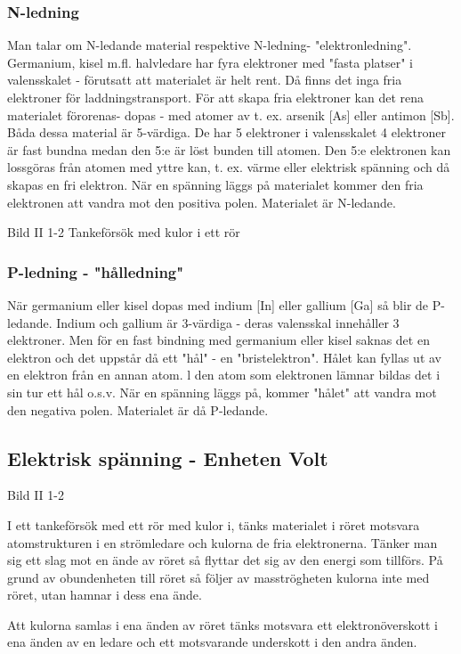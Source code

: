 \documentclass[a4paper,twoside,twocolumn,openright]{book}
\begin{document}
\subsubsection{N-ledning}
Man talar om N-ledande material respektive
N-ledning- "elektronledning".
Germanium, kisel m.fl. halvledare har
fyra elektroner med "fasta platser" i valensskalet - förutsatt att materialet är helt
rent. Då finns det inga fria elektroner för
laddningstransport.
För att skapa fria elektroner kan det rena
materialet förorenas- dopas - med atomer
av t. ex. arsenik [As] eller antimon [Sb]. Båda
dessa material är 5-värdiga. De har 5 elektroner i valensskalet
4 elektroner är fast bundna medan den 5:e är
löst bunden till atomen. Den 5:e elektronen
kan lossgöras från atomen med yttre
kan, t. ex. värme eller elektrisk spänning och
då skapas en fri elektron. När en spänning
läggs på materialet kommer den fria elektronen att vandra mot den positiva polen. Materialet är N-ledande.

Bild II 1-2 Tankeförsök med kulor i ett rör

\subsubsection{P-ledning - "hålledning"}
När germanium eller kisel dopas med indium
[In] eller gallium [Ga] så blir de P-ledande.
Indium och gallium är 3-värdiga - deras
valensskal innehåller 3 elektroner. Men för
en fast bindning med germanium eller kisel
saknas det en elektron och det uppstår då ett
"hål" - en "bristelektron". Hålet kan fyllas ut
av en elektron från en annan atom. l den
atom som elektronen lämnar bildas det i sin
tur ett hål o.s.v. När en spänning läggs på,
kommer "hålet" att vandra mot den negativa
polen. Materialet är då P-ledande.

\subsection{Elektrisk spänning - Enheten Volt}
Bild II 1-2

I ett tankeförsök med ett rör med kulor i, tänks materialet i röret motsvara
atomstrukturen i en strömledare och kulorna de fria elektronerna. Tänker man sig ett slag
mot en ände av röret så flyttar det sig av den energi som tillförs. På grund av
obundenheten till röret så följer av masströgheten kulorna inte med röret, utan hamnar i dess ena ände.

Att kulorna samlas i ena änden av röret tänks motsvara ett elektronöverskott i ena
änden av en ledare och ett motsvarande underskott i den andra änden.
\end{document}
